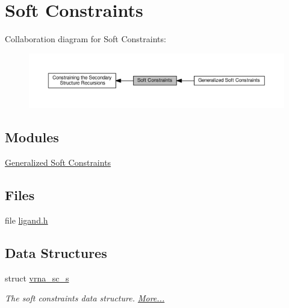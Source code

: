 \hypertarget{group__soft__constraints}{}\section{Soft Constraints}
\label{group__soft__constraints}
Collaboration diagram for Soft Constraints\+:
\nopagebreak
\begin{figure}[H]
\begin{center}
\leavevmode
\includegraphics[width=350pt]{group__soft__constraints}
\end{center}
\end{figure}
\subsection*{Modules}
\begin{DoxyCompactItemize}
\item 
\hyperlink{group__generalized__sc}{Generalized Soft Constraints}
\end{DoxyCompactItemize}
\subsection*{Files}
\begin{DoxyCompactItemize}
\item 
file \hyperlink{ligand_8h}{ligand.\+h}
\end{DoxyCompactItemize}
\subsection*{Data Structures}
\begin{DoxyCompactItemize}
\item 
struct \hyperlink{group__soft__constraints_structvrna__sc__s}{vrna\+\_\+sc\+\_\+s}
\begin{DoxyCompactList}\small\item\em The soft constraints data structure.  \hyperlink{group__soft__constraints_structvrna__sc__s}{More...}\end{DoxyCompactList}\end{DoxyCompactItemize}
